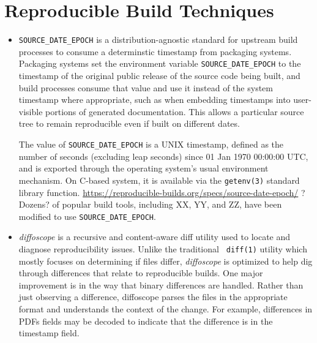 \section{Reproducible Build Techniques}
\label{SEC:techniques}


\begin{itemize}

\item {\tt SOURCE\_DATE\_EPOCH} is a distribution-agnostic standard for
upstream build processes to consume a determinstic timestamp from packaging
systems.
Packaging systems set the environment variable \texttt{SOURCE\_DATE\_EPOCH} to the timestamp of the original public release of the source code being built,
and build processes consume that value and use it instead of the system timestamp where appropriate,
such as when embedding timestamps into user-visible portions of generated documentation.
This allows a particular source tree  to remain reproducible even if built on different dates.

The value of {\tt SOURCE\_DATE\_EPOCH} is a UNIX timestamp, defined as the number of seconds
(excluding leap seconds) since 01 Jan 1970 00:00:00 UTC, and is exported 
through the operating system's usual environment mechanism.
On C-based system, it is available via the {\tt getenv(3)} standard library function.
\url{https://reproducible-builds.org/specs/source-date-epoch/}
?Dozens? of popular build tools, including XX, YY, and ZZ, have been 
modified to use {\tt SOURCE\_DATE\_EPOCH}.


\item {\em diffoscope} is a recursive and content-aware diff utility used
to locate and diagnose reproducibility issues. Unlike the traditional {\tt
diff(1)} utility which mostly focuses on determining if files differ, 
{\em diffoscope} is optimized to help dig through differences that relate 
to reproducible builds.  One major improvement is in the way that binary
differences are handled.  Rather than just observing a difference,
diffoscope parses the files in the appropriate format and understands the
context of the change.  For example, differences in PDFs fields may be
decoded to indicate that the difference is in the timestamp field.


\end{itemize}
